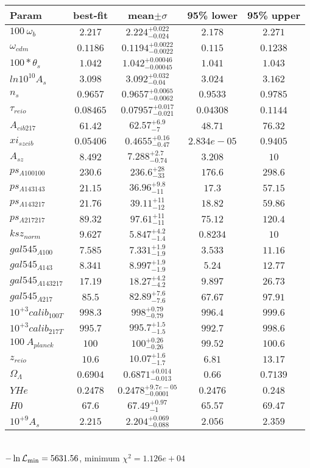 \begin{tabular}{|l|c|c|c|c|} 
 \hline 
Param & best-fit & mean$\pm\sigma$ & 95\% lower & 95\% upper \\ \hline 
$100~\omega_{b }$ &$2.217$ & $2.224_{-0.024}^{+0.022}$ & $2.178$ & $2.271$ \\ 
$\omega_{cdm }$ &$0.1186$ & $0.1194_{-0.0022}^{+0.0022}$ & $0.115$ & $0.1238$ \\ 
$100*\theta_{s }$ &$1.042$ & $1.042_{-0.00045}^{+0.00046}$ & $1.041$ & $1.043$ \\ 
$ln10^{10}A_{s }$ &$3.098$ & $3.092_{-0.04}^{+0.032}$ & $3.024$ & $3.162$ \\ 
$n_{s }$ &$0.9657$ & $0.9657_{-0.0062}^{+0.0065}$ & $0.9533$ & $0.9785$ \\ 
$\tau_{reio }$ &$0.08465$ & $0.07957_{-0.021}^{+0.017}$ & $0.04308$ & $0.1144$ \\ 
$A_{cib 217 }$ &$61.42$ & $62.57_{-7}^{+6.9}$ & $48.71$ & $76.32$ \\ 
$xi_{sz cib }$ &$0.05406$ & $0.4655_{-0.47}^{+0.16}$ & $2.834e-05$ & $0.9405$ \\ 
$A_{sz }$ &$8.492$ & $7.288_{-0.74}^{+2.7}$ & $3.208$ & $10$ \\ 
$ps_{A 100 100 }$ &$230.6$ & $236.6_{-33}^{+28}$ & $176.6$ & $298.6$ \\ 
$ps_{A 143 143 }$ &$21.15$ & $36.96_{-11}^{+9.8}$ & $17.3$ & $57.15$ \\ 
$ps_{A 143 217 }$ &$21.76$ & $39.11_{-12}^{+11}$ & $18.82$ & $59.86$ \\ 
$ps_{A 217 217 }$ &$89.32$ & $97.61_{-11}^{+11}$ & $75.12$ & $120.4$ \\ 
$ksz_{norm }$ &$9.627$ & $5.847_{-1.4}^{+4.2}$ & $0.8234$ & $10$ \\ 
$gal545_{A 100 }$ &$7.585$ & $7.331_{-1.9}^{+1.9}$ & $3.533$ & $11.16$ \\ 
$gal545_{A 143 }$ &$8.341$ & $8.997_{-1.9}^{+1.9}$ & $5.24$ & $12.77$ \\ 
$gal545_{A 143 217 }$ &$17.19$ & $18.27_{-4.2}^{+4.2}$ & $9.897$ & $26.73$ \\ 
$gal545_{A 217 }$ &$85.5$ & $82.89_{-7.6}^{+7.6}$ & $67.67$ & $97.91$ \\ 
$10^{+3}calib_{100T }$ &$998.3$ & $998_{-0.79}^{+0.79}$ & $996.4$ & $999.6$ \\ 
$10^{+3}calib_{217T }$ &$995.7$ & $995.7_{-1.5}^{+1.5}$ & $992.7$ & $998.6$ \\ 
$100~A_{planck }$ &$100$ & $100_{-0.26}^{+0.26}$ & $99.52$ & $100.6$ \\ 
$z_{reio }$ &$10.6$ & $10.07_{-1.7}^{+1.6}$ & $6.81$ & $13.17$ \\ 
$\Omega_{\Lambda }$ &$0.6904$ & $0.6871_{-0.013}^{+0.014}$ & $0.66$ & $0.7139$ \\ 
$YHe$ &$0.2478$ & $0.2478_{-0.0001}^{+9.7e-05}$ & $0.2476$ & $0.248$ \\ 
$H0$ &$67.6$ & $67.49_{-1}^{+0.97}$ & $65.57$ & $69.47$ \\ 
$10^{+9}A_{s }$ &$2.215$ & $2.204_{-0.088}^{+0.069}$ & $2.056$ & $2.359$ \\ 
\hline 
 \end{tabular} \\ 
$-\ln{\cal L}_\mathrm{min} =5631.56$, minimum $\chi^2=1.126e+04$ \\ 
